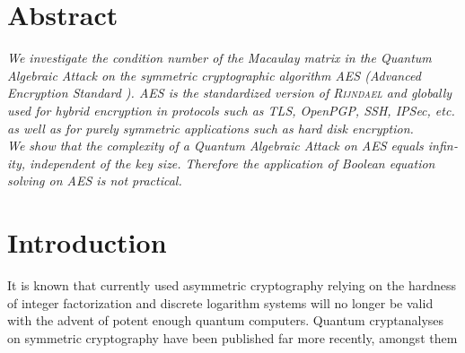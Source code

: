 \documentclass[a4paper,11pt]{article}
\begin{document}
\begin{otherlanguage}{english}

\vspace{3mm}



\section{Abstract}

\noindent
\textit{We investigate the condition number of the Macaulay matrix in the Quantum Algebraic Attack \cite{QAA} on the symmetric cryptographic algorithm \textsc{AES} (Advanced Encryption Standard \cite{AES}). \textsc{AES} is the standardized version of \textsc{Rijndael} and globally used for hybrid encryption in protocols such as TLS, OpenPGP, SSH, IPSec, etc. as well as for purely symmetric applications such as hard disk encryption.} \\

\noindent
\textit{We show that the complexity of a Quantum Algebraic Attack on \textsc{AES} equals infinity, independent of the key size. Therefore the application of Boolean equation solving \cite{QAA} on \textsc{AES} is not practical.} \\


\section{Introduction}

\noindent
It is known that currently used asymmetric cryptography relying on the hardness of integer factorization and discrete logarithm systems will no longer be valid with the advent of potent enough quantum computers. Quantum cryptanalyses on symmetric cryptography have been published far more recently, amongst them \\


\end{otherlanguage}
\end{document}
